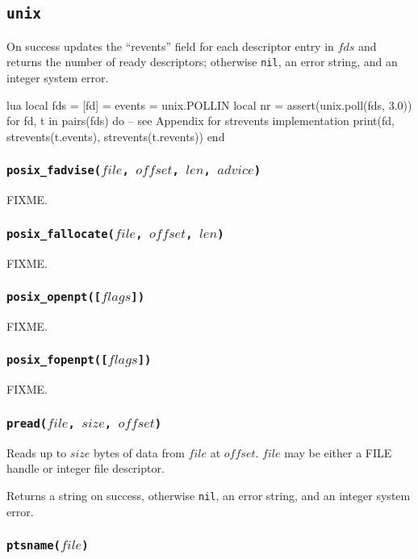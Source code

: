 \documentclass[11pt, oneside]{memoir}
\newcommand*{\nil}[0]{\texttt{nil}\xspace}
\newcommand*{\fn}[1]{\texttt{#1}\xspace}
\newcommand*{\otherwise}[1]{otherwise #1, an error string, and an integer system error}
\newcounter{toccols}
\newenvironment{Module}[1]{
	\subsection{\texttt{#1}}
	\addtocontents{toc}{
		\protect\begin{multicols}{\value{toccols}}
	}
}{
	\addtocontents{toc}{\protect\end{multicols}}
}
\begin{document}
\begin{Module}{unix}
On success updates the ``revents'' field for each descriptor entry in $fds$ and returns the number of ready descriptors; \otherwise{\nil}.

\begin{example}{lua}
local fds = { [fd] = { events = unix.POLLIN } }
local nr = assert(unix.poll(fds, 3.0))
for fd, t in pairs(fds) do
  -- see Appendix for strevents implementation
  print(fd, strevents(t.events), strevents(t.revents))
end
\end{example}

\subsubsection[\fn{posix\_fadvise}]{\fn{posix\_fadvise($file$, $offset$, $len$, $advice$)}}

FIXME.

\subsubsection[\fn{posix\_fallocate}]{\fn{posix\_fallocate($file$, $offset$, $len$)}}

FIXME.

\subsubsection[\fn{posix\_openpt}]{\fn{posix\_openpt([$flags$])}}

FIXME.

\subsubsection[\fn{posix\_fopenpt}]{\fn{posix\_fopenpt([$flags$])}}

FIXME.

\subsubsection[\fn{pread}]{\fn{pread($file$, $size$, $offset$)}}

Reads up to $size$ bytes of data from $file$ at $offset$. $file$ may be either a FILE handle or integer file descriptor.

Returns a string on success, \otherwise{\nil}.

\subsubsection[\fn{ptsname}]{\fn{ptsname($file$)}}


\end{Module}
\end{document}
